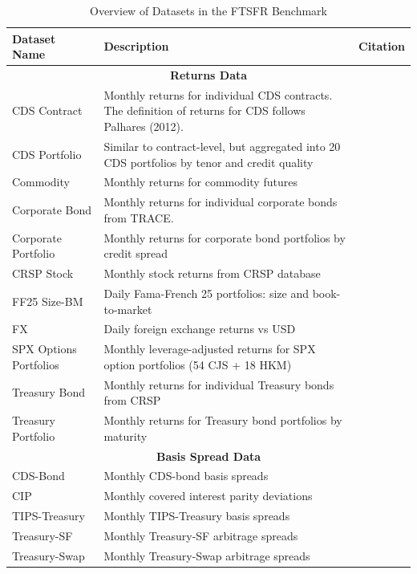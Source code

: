 \documentclass{article}
\begin{document}
\begin{table}[htbp]
\centering
\caption{Overview of Datasets in the FTSFR Benchmark}
\label{tab:datasets}
\footnotesize
\begin{tabular}{p{3cm}p{6cm}p{3.5cm}}
\toprule
Dataset Name & Description & Citation \\ 
\midrule
\multicolumn{3}{c}{\textbf{Returns Data}} \\
\midrule
CDS Contract & Monthly returns for individual CDS contracts. The definition of returns for CDS follows Palhares (2012). & \cite{Palhares2012} \\
CDS Portfolio & Similar to contract-level, but aggregated into 20 CDS portfolios by tenor and credit quality & \cite{He2017} \\
Commodity & Monthly returns for commodity futures & \cite{Yang2013} \\
Corporate Bond & Monthly returns for individual corporate bonds from TRACE. & \cite{Dickerson2024} \\
Corporate Portfolio & Monthly returns for corporate bond portfolios by credit spread & \cite{Nozawa2017} \\
CRSP Stock & Monthly stock returns from CRSP database & \cite{Fama1993} \\
FF25 Size-BM & Daily Fama-French 25 portfolios: size and book-to-market & \cite{Fama1993} \\
FX & Daily foreign exchange returns vs USD & \cite{Lettau2014} \\
SPX Options Portfolios & Monthly leverage-adjusted returns for SPX option portfolios (54 CJS + 18 HKM) & \cite{Constantinides2013} \\
Treasury Bond & Monthly returns for individual Treasury bonds from CRSP & \cite{Gurkaynak2007} \\
Treasury Portfolio & Monthly returns for Treasury bond portfolios by maturity & \cite{Gurkaynak2007} \\
\midrule
\multicolumn{3}{c}{\textbf{Basis Spread Data}} \\
\midrule
CDS-Bond & Monthly CDS-bond basis spreads & \cite{Siriwardane2021} \\
CIP & Monthly covered interest parity deviations & \cite{Du2018} \\
TIPS-Treasury & Monthly TIPS-Treasury basis spreads & \cite{Fleckenstein2014} \\
Treasury-SF & Monthly Treasury-SF arbitrage spreads & \cite{Fleckenstein2020} \\
Treasury-Swap & Monthly Treasury-Swap arbitrage spreads & \cite{Siriwardane2021} \\

\end{tabular}
\end{table}
\end{document}
